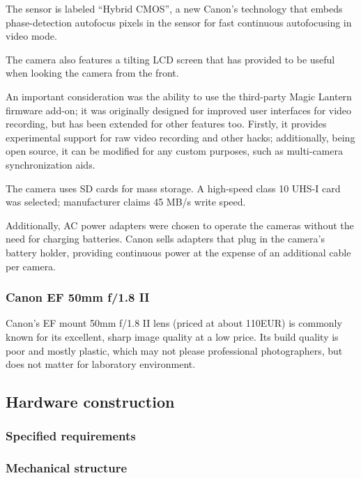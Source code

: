 The sensor is labeled ``Hybrid CMOS'', a new Canon's technology that embeds phase-detection autofocus pixels in the sensor for fast continuous autofocusing in video mode.

The camera also features a tilting LCD screen that has provided to be useful when looking the camera from the front.

An important consideration was the ability to use the third-party Magic Lantern firmware add-on;
it was originally designed for improved user interfaces for video recording, but has been extended for other features too.
Firstly, it provides experimental support for raw video recording and other hacks; additionally, being open source, it can be modified for any custom purposes, such as multi-camera synchronization aids.

The camera uses SD cards for mass storage. A high-speed class 10 UHS-I card was selected; manufacturer claims 45 MB/s write speed.

Additionally, AC power adapters were chosen to operate the cameras without the need for charging batteries.
Canon sells adapters that plug in the camera's battery holder, providing continuous power at the expense of an additional cable per camera.

\subsubsection{Canon EF 50mm f/1.8 II}

Canon's EF mount 50mm f/1.8 II lens (priced at about 110EUR) is commonly known for its excellent, sharp image quality at a low price.
Its build quality is poor and mostly plastic, which may not please professional photographers, but does not matter for laboratory environment.


\subsection{Hardware construction} %

\subsubsection{Specified requirements}

\subsubsection{Mechanical structure}

